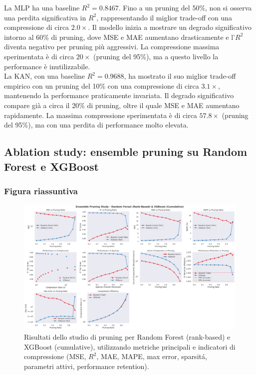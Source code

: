 \documentclass[a4paper,12pt]{report}
\begin{document}
	La MLP ha una baseline \(R^2=0.8467\). Fino a un pruning del 50\%, non si osserva una perdita significativa in \(R^2\), rappresentando il miglior trade-off con una compressione di circa $2.0\times$. Il modello inizia a mostrare un degrado significativo intorno al 60\% di pruning, dove MSE e MAE aumentano drasticamente e l'\(R^2\) diventa negativo per pruning più aggressivi. La compressione massima sperimentata è di circa $20\times$ (pruning del 95\%), ma a questo livello la performance è inutilizzabile. \\
	La KAN, con una baseline \(R^2=0.9688\), ha mostrato il suo miglior trade-off empirico con un pruning del 10\% con una compressione di circa $3.1\times$, mantenendo la performance praticamente invariata. Il degrado significativo compare già a circa il 20\% di pruning, oltre il quale MSE e MAE aumentano rapidamente. La massima compressione sperimentata è di circa $57.8\times$ (pruning del 95\%), ma con una perdita di performance molto elevata. \\
	
	\subsection{Ablation study: ensemble pruning su Random Forest e XGBoost}
	
	\subsubsection{Figura riassuntiva}
	\begin{figure}[H]
		\centering
		\includegraphics[width=\textwidth]{img/abl_xgbvsrf_car.png}
		\caption{Risultati dello studio di pruning per Random Forest (rank-based) e XGBoost (cumulative), utilizzando metriche principali e indicatori di compressione (MSE, \(R^2\), MAE, MAPE, max error, sparsitá, parametri attivi, performance retention).}
	\end{figure}
	
\end{document}

